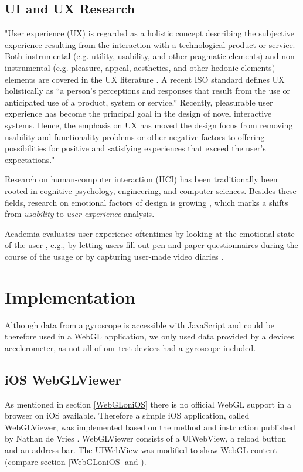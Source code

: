 \documentclass[12pt,journal,compsoc]{IEEEtran}
\begin{document}
\subsection{UI and UX Research}
"User experience (UX) is regarded as a holistic concept describing the subjective experience resulting from the interaction with a technological product or service. Both instrumental (e.g. utility, usability, and other pragmatic elements) and non- instrumental (e.g. pleasure, appeal, aesthetics, and other hedonic elements) elements are covered in the UX literature \cite{Hassenzahl2006}. A recent ISO standard \cite{FDIS2009} defines UX holistically as “a person's perceptions and responses that result from the use or anticipated use of a product, system or service.” Recently, pleasurable user experience has become the principal goal in the design of novel interactive systems. Hence, the emphasis on UX has moved the design focus from removing usability and functionality problems or other negative factors to offering possibilities for positive and satisfying experiences that exceed the user’s expectations."

Research on human-computer interaction (HCI) has been traditionally been rooted in cognitive psychology, engineering, and computer sciences. Besides these fields, research on emotional factors of design is growing \cite{Norman2002}, which marks a shifts from \textit{usability} to \textit{user experience} analysis.

Academia evaluates user experience oftentimes by looking at the emotional state of the user \cite{Roto2006}, e.g., by letting users fill out pen-and-paper questionnaires during the course of the usage or by capturing user-made video diaries \cite{Csikszentmihalyi1987, Isomursu2004}.




\section{Implementation}
Although data from a gyroscope is accessible with JavaScript and could be therefore used in a WebGL application, we only used data provided by a devices accelerometer, as not all of our test devices had a gyroscope included.

\subsection{iOS WebGLViewer} \label{WebGLViewer}
	As mentioned in section \ref{WebGLoniOS} there is no official WebGL support in a browser on iOS available. Therefore a simple iOS application, called WebGLViewer, was implemented based on the method and instruction published by Nathan de Vries \cite{deVries2011}. WebGLViewer consists of a UIWebView, a reload button and an address bar. The UIWebView was modified to show WebGL content (compare section \ref{WebGLoniOS} and \cite{deVries2011}). 
	
\end{document}
